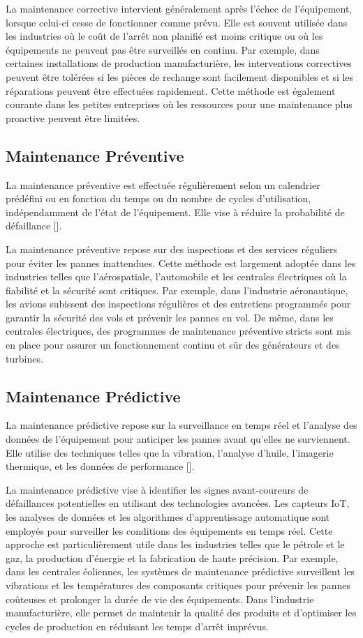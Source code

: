 La maintenance corrective intervient généralement après l'échec de
l'équipement, lorsque celui-ci cesse de fonctionner comme prévu. Elle est
souvent utilisée dans les industries où le coût de l'arrêt non planifié est
moins critique ou où les équipements ne peuvent pas être surveillés en continu.
Par exemple, dans certaines installations de production manufacturière, les
interventions correctives peuvent être tolérées si les pièces de rechange sont
facilement disponibles et si les réparations peuvent être effectuées
rapidement. Cette méthode est également courante dans les petites entreprises
où les ressources pour une maintenance plus proactive peuvent être limitées.

\subsection{Maintenance Préventive}
La maintenance préventive est effectuée régulièrement selon un calendrier
prédéfini ou en fonction du temps ou du nombre de cycles d’utilisation,
indépendamment de l’état de l’équipement. Elle vise à réduire la probabilité de
défaillance [\cite{Sezdi2019}].

La maintenance préventive repose sur des inspections et des services réguliers
pour éviter les pannes inattendues. Cette méthode est largement adoptée dans
les industries telles que l'aérospatiale, l'automobile et les centrales
électriques où la fiabilité et la sécurité sont critiques. Par exemple, dans
l'industrie aéronautique, les avions subissent des inspections régulières et
des entretiens programmés pour garantir la sécurité des vols et prévenir les
pannes en vol. De même, dans les centrales électriques, des programmes de
maintenance préventive stricts sont mis en place pour assurer un fonctionnement
continu et sûr des générateurs et des turbines.

\subsection{Maintenance Prédictive}
La maintenance prédictive repose sur la surveillance en temps réel et l’analyse
des données de l’équipement pour anticiper les pannes avant qu’elles ne
surviennent. Elle utilise des techniques telles que la vibration, l’analyse
d’huile, l’imagerie thermique, et les données de performance​
[\cite{Bentivogli2023, Sangeetha2017}].

La maintenance prédictive vise à identifier les signes avant-coureurs de
défaillances potentielles en utilisant des technologies avancées. Les capteurs
IoT, les analyses de données et les algorithmes d'apprentissage automatique
sont employés pour surveiller les conditions des équipements en temps réel.
Cette approche est particulièrement utile dans les industries telles que le
pétrole et le gaz, la production d'énergie et la fabrication de haute
précision. Par exemple, dans les centrales éoliennes, les systèmes de
maintenance prédictive surveillent les vibrations et les températures des
composants critiques pour prévenir les pannes coûteuses et prolonger la durée
de vie des équipements. Dans l'industrie manufacturière, elle permet de
maintenir la qualité des produits et d'optimiser les cycles de production en
réduisant les temps d'arrêt imprévus.

